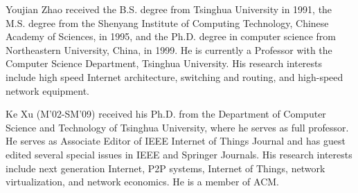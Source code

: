 \documentclass[10pt,journal,compsoc]{IEEEtran}
\begin{document}
\begin{IEEEbiography}
{Youjian Zhao} received the B.S. degree from Tsinghua University in 1991, the M.S. degree from the Shenyang Institute of Computing Technology, Chinese Academy of Sciences, in 1995, and the Ph.D. degree in computer science from Northeastern University, China, in 1999. He is currently a Professor with the Computer Science Department, Tsinghua University. His research interests include high speed Internet architecture, switching and routing, and high-speed network equipment.
\end{IEEEbiography}

\begin{IEEEbiography}{Ke Xu} (M'02-SM'09) received his Ph.D. from the Department of Computer Science and Technology of Tsinghua University, where he serves as full professor. He serves as Associate Editor of IEEE Internet of Things Journal and has guest edited several special issues in IEEE and Springer Journals. His research interests include next generation Internet, P2P systems, Internet of Things, network virtualization, and network economics. He is a member of ACM.
\end{IEEEbiography}
\end{document}
